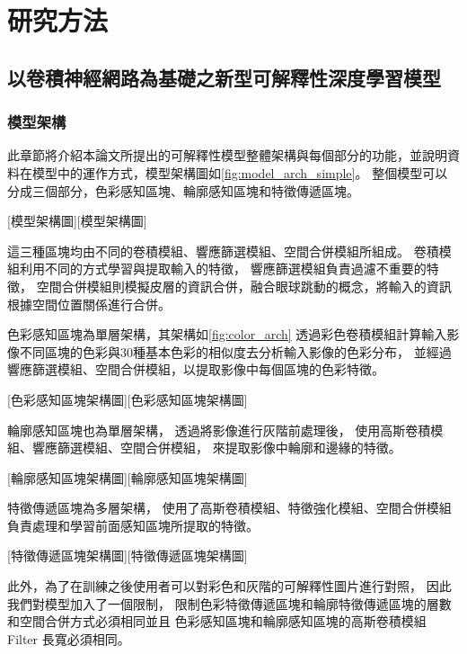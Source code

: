 \documentclass[class=NCU_thesis, crop=false]{standalone}
\begin{document}
\chapter{研究方法}

\section{以卷積神經網路為基礎之新型可解釋性深度學習模型}
\subsection{模型架構}

此章節將介紹本論文所提出的可解釋性模型整體架構與每個部分的功能，並說明資料在模型中的運作方式，模型架構圖如\cref{fig:model_arch_simple}。
整個模型可以分成三個部分，色彩感知區塊、輪廓感知區塊和特徵傳遞區塊。

[模型架構圖][模型架構圖]

\pagebreak

這三種區塊均由不同的卷積模組、響應篩選模組、空間合併模組所組成。
卷積模組利用不同的方式學習與提取輸入的特徵，
響應篩選模組負責過濾不重要的特徵，
空間合併模組則模擬皮層的資訊合併，融合眼球跳動的概念，將輸入的資訊根據空間位置關係進行合併。

色彩感知區塊為單層架構，其架構如\cref{fig:color_arch}
透過彩色卷積模組計算輸入影像不同區塊的色彩與30種基本色彩的相似度去分析輸入影像的色彩分布，
並經過響應篩選模組、空間合併模組，以提取影像中每個區塊的色彩特徵。

[色彩感知區塊架構圖][色彩感知區塊架構圖]

輪廓感知區塊也為單層架構，
透過將影像進行灰階前處理後，
使用高斯卷積模組、響應篩選模組、空間合併模組，
來提取影像中輪廓和邊緣的特徵。

[輪廓感知區塊架構圖][輪廓感知區塊架構圖]

特徵傳遞區塊為多層架構，
使用了高斯卷積模組、特徵強化模組、空間合併模組
負責處理和學習前面感知區塊所提取的特徵。

[特徵傳遞區塊架構圖][特徵傳遞區塊架構圖]

此外，為了在訓練之後使用者可以對彩色和灰階的可解釋性圖片進行對照，
因此我們對模型加入了一個限制，
限制色彩特徵傳遞區塊和輪廓特徵傳遞區塊的層數和空間合併方式必須相同並且
色彩感知區塊和輪廓感知區塊的高斯卷積模組 Filter 長寬必須相同。
\end{document}
